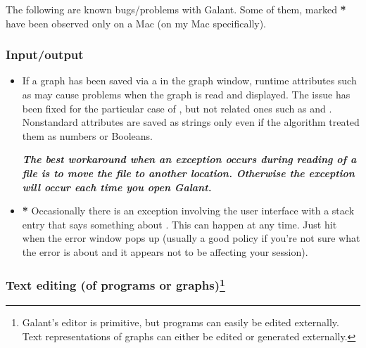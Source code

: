 The following are known bugs/problems with Galant. Some of them, marked
\textbf{*} have been observed only on a Mac (on my Mac specifically).

\subsubsection*{Input/output}

\begin{itemize}

\item
  If a graph has been saved via a  in the graph
  window, runtime attributes such as  may cause problems when
  the graph is read and displayed. The issue has been fixed for the
  particular case of , but not related ones such as
   and . Nonstandard attributes are
  saved as strings only even if the algorithm treated them as numbers or
  Booleans.

  \textbf{\emph{The best workaround when an exception occurs during reading
      of a  file is to move the file to another
      location. Otherwise the exception will occur each time you open Galant.}}
  
\item \textbf{*} Occasionally there is an exception involving the user
  interface with a stack entry that says something about
  . This can happen at any time. Just hit 
  when the error window pops up (usually a good policy if you're not sure
  what the error is about and it appears not to be affecting your session).
\end{itemize}

\subsubsection*{Text editing (of programs or graphs)\footnote{
Galant's editor is primitive, but
programs can easily be edited externally.
Text representations of graphs can either be edited or generated externally.}}

